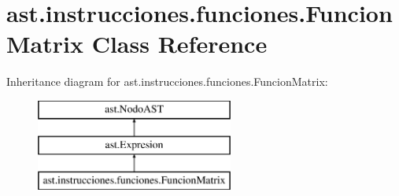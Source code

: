 \hypertarget{classast_1_1instrucciones_1_1funciones_1_1_funcion_matrix}{}\section{ast.\+instrucciones.\+funciones.\+Funcion\+Matrix Class Reference}
\label{classast_1_1instrucciones_1_1funciones_1_1_funcion_matrix}
Inheritance diagram for ast.\+instrucciones.\+funciones.\+Funcion\+Matrix\+:\begin{figure}[H]
\begin{center}
\leavevmode
\includegraphics[height=3.000000cm]{classast_1_1instrucciones_1_1funciones_1_1_funcion_matrix}
\end{center}
\end{figure}
